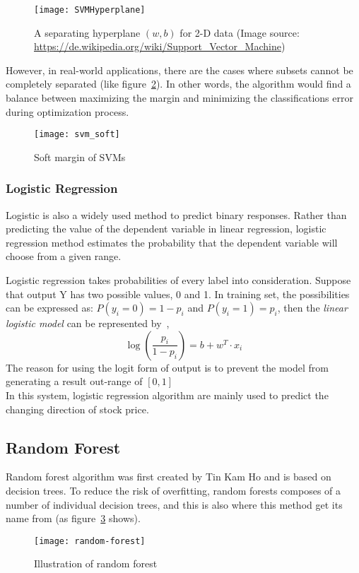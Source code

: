 \begin{figure}[h]
	\centering
	\texttt{[image: SVMHyperplane]}
	\caption{A separating hyperplane $ (w, b) $ for 2-D data (Image source: \url{https://de.wikipedia.org/wiki/Support_Vector_Machine})}
	\label{fg:SVMHyperplane}
\end{figure}


However, in real-world applications, there are the cases where subsets cannot be completely separated (like figure~\ref{fg:SVM_soft})\cite[p.~113]{4_kantardzic}. In other words, the algorithm would find a balance between maximizing the margin and minimizing the classifications error during optimization process.
\begin{figure}[h]
	\centering
	\texttt{[image: svm\_soft]}
	\caption{Soft margin of SVMs}
	\label{fg:SVM_soft}
\end{figure}

\subsubsection{Logistic Regression}
Logistic is also a widely used method to predict binary responses. Rather than predicting the value of the dependent variable in linear regression, logistic regression method estimates the probability that the dependent variable will choose from a given range\cite{4_kantardzic}.

 
Logistic regression takes probabilities of every label into consideration. Suppose that output Y has two possible values, 0 and 1. In training set, the possibilities can be expressed as: $ P(y_i=0)=1-p_i $ and $ P(y_i=1)=p_i $, then the \textit{linear logistic model} can be represented by~\cite{4_kantardzic},
\begin{equation}
	\log (\frac{p_i}{1-p_i}) = b + w^T \cdot x_i
\end{equation}
The reason for using the logit form of output is to prevent the model from generating a result out-range of $ [0, 1] $\\


In this system, logistic regression algorithm are mainly used to predict the changing direction of stock price.

\subsection{Random Forest}
Random forest algorithm was first created by Tin Kam Ho\cite{ho1995random} and is based on decision trees. To reduce the risk of overfitting, random forests composes of a number of individual decision trees, and this is also where this method get its name from (as figure~\ref{fg:decision-tree} shows).
\begin{figure}[h]
	\centering
	\texttt{[image: random-forest]}
	\caption{Illustration of random forest}
	\label{fg:decision-tree}
\end{figure}

